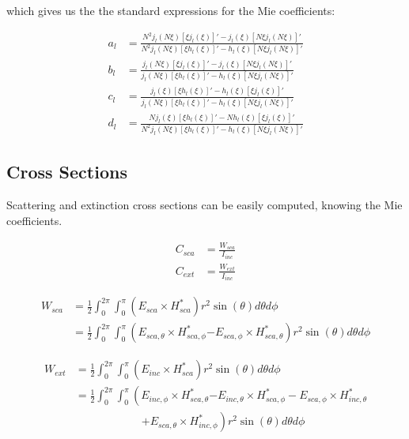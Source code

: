         which gives us the the standard expressions for the Mie coefficients:

        \begin{align}
            a_l &= \frac{N^2 j_l(N\xi)[\xi j_l(\xi)]' - j_l(\xi)[N\xi j_l(N \xi)]'}{N^2 j_l(N\xi)[\xi h_l(\xi)]' - h_l(\xi)[N\xi j_l(N \xi)]'}\\
            b_l &= \frac{j_l(N\xi)[\xi j_l(\xi)]' - j_l(\xi)[N\xi j_l(N\xi)]'}{j_l(N\xi)[\xi h_l(\xi)]' - h_l(\xi)[N\xi j_l(N\xi)]'}\\
            c_l &= \frac{j_l(\xi)[\xi h_l(\xi)]' - h_l(\xi)[\xi j_l(\xi)]'}{j_l(N\xi)[\xi h_l(\xi)]' - h_l(\xi)[N\xi j_l(N\xi)]'}\\
            d_l &= \frac{Nj_l(\xi)[\xi h_l(\xi)]' - N h_l(\xi)[\xi j_l(\xi)]'}{N^2 j_l(N\xi)[\xi h_l(\xi)]' - h_l(\xi)[N\xi j_l(N\xi)]'}
        \end{align}

    \subsection{Cross Sections}
        Scattering and extinction cross sections can be easily computed, knowing the Mie coefficients.

        \begin{align}
            C_{sca} &= \frac{W_{sca}}{I_{inc}} \\
            C_{ext} &= \frac{W_{ext}}{I_{inc}}
        \end{align}

        \begin{align}
            W_{sca} &= \frac{1}{2}\int_0^{2\pi}\int_0^\pi \left(E_{sca} \times H^*_{sca}\right)r^2\sin(\theta)d\theta d\phi \\
             &= \frac{1}{2}\int_0^{2\pi}\int_0^\pi \left(E_{sca,\theta} \times H^*_{sca,\phi}\right.
                            \left.- E_{sca,\phi} \times H^*_{sca,\theta}\right)r^2\sin(\theta)d\theta d\phi
        \end{align}

        \begin{align}
            W_{ext} &= \frac{1}{2}\int_0^{2\pi}\int_0^\pi \left(E_{inc} \times H^*_{sca}\right)r^2\sin(\theta)d\theta d\phi \\
             &= \frac{1}{2}\int_0^{2\pi}\int_0^\pi \left(E_{inc,\phi} \times H^*_{sca,\theta}\right.
                            \left.- E_{inc,\theta} \times H^*_{sca,\phi} - E_{sca,\phi} \times H^*_{inc,\theta} \right.\nonumber\\
                                           &\qquad\qquad\qquad\left.+ E_{sca,\theta} \times H^*_{inc,\phi}\right)r^2\sin(\theta)d\theta d\phi
        \end{align}

